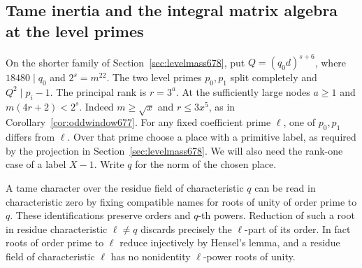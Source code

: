 \documentclass[a4paper,11pt]{article}
\theoremstyle{definition}
\theoremstyle{remark}
\numberwithin{equation}{section}
\begin{document}
\subsection{Tame inertia and the integral matrix algebra at the level primes}
\label{sec:markedmatrix715}

On the shorter family of Section~\ref{sec:levelmass678}, put
\(Q=(q_0d)^{s+6}\), where \(18480\mid q_0\) and \(2^s=m^{22}\).
The two level primes \(p_0,p_1\) split completely and
\(Q^2\mid p_i-1\). The principal rank is \(r=3^a\). At the
sufficiently large nodes \(a\ge1\) and \(m(4r+2)<2^s\).
Indeed \(m\ge\sqrt x\) and \(r\le3x^5\), as in
Corollary~\ref{cor:oddwindow677}. For any fixed coefficient
prime \(\ell\), one of \(p_0,p_1\) differs from \(\ell\). Over
that prime choose a place with a primitive label, as required
by the projection in Section~\ref{sec:levelmass678}. We will
also need the rank-one case of a label \(X-1\). Write \(q\)
for the norm of the chosen place.

A tame character over the residue field of characteristic \(q\)
can be read in characteristic zero by fixing compatible names
for roots of unity of order prime to \(q\). These identifications
preserve orders and \(q\)-th powers. Reduction of such a root
in residue characteristic \(\ell\ne q\) discards precisely
the \(\ell\)-part of its order. In fact roots of order prime to
\(\ell\) reduce injectively by Hensel's lemma, and a residue
field of characteristic \(\ell\) has no nonidentity
\(\ell\)-power roots of unity.
\end{document}

